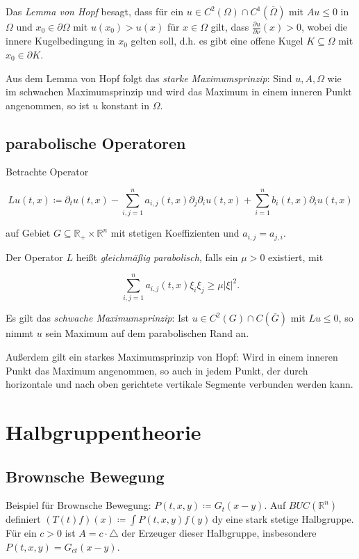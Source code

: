 \documentclass[11pt,a4paper]{scrartcl}
\newcommand{\R}{\mathbb{R}} %
\theoremstyle{plain}
\theoremstyle{definition}
\theoremstyle{remark}
\begin{document}
Das \emph{Lemma von Hopf} besagt, dass für ein $u\in C^2(\Omega) \cap C^1(\overline{\Omega})$ mit $Au\leq 0$ in $\Omega$ und $x_0\in \partial\Omega$ mit $u(x_0) > u(x)$ für $x\in \Omega$ gilt, dass $\frac{\partial u}{\partial \nu}(x) > 0$, wobei die innere Kugelbedingung in $x_0$ gelten soll, d.h. es gibt eine offene Kugel $K\subseteq \Omega$ mit $x_0 \in \partial K$.

Aus dem Lemma von Hopf folgt das \emph{starke Maximumsprinzip}: Sind $u,A,\Omega$ wie im schwachen Maximumsprinzip und wird das Maximum in einem inneren Punkt angenommen, so ist $u$ konstant in $\Omega$.

\subsection{parabolische Operatoren}

Betrachte Operator

$$Lu(t,x)\coloneqq \partial_t u(t,x) -\sum_{i,j=1}^n a_{i,j}(t,x)\partial_j \partial_i u(t,x) + \sum_{i=1}^n b_i(t,x) \partial_i u(t,x)$$

auf Gebiet $G\subseteq \R_+ \times \R^n$ mit stetigen Koeffizienten und $a_{i,j}=a_{j,i}$.

Der Operator $L$ heißt \emph{gleichmäßig parabolisch}, falls ein $\mu > 0$ existiert, mit

$$\sum_{i,j=1}^n a_{i,j}(t,x)\xi_i\xi_j \geq \mu |\xi|^2.$$

Es gilt das \emph{schwache Maximumsprinzip}: Ist $u\in C^2(G) \cap C(\overline{G})$ mit $Lu \leq 0$, so nimmt $u$ sein Maximum auf dem parabolischen Rand an.

Außerdem gilt ein starkes Maximumsprinzip von Hopf: Wird in einem inneren Punkt das Maximum angenommen, so auch in jedem Punkt, der durch horizontale und nach oben gerichtete vertikale Segmente verbunden werden kann.

\section{Halbgruppentheorie}

\subsection{Brownsche Bewegung}

Beispiel für Brownsche Bewegung: $P(t,x,y)\coloneqq G_t(x-y)$. Auf $BUC(\R^n)$ definiert $(T(t)f)(x)\coloneqq \int P(t,x,y)f(y) \, \mathrm{dy}$ eine stark stetige Halbgruppe. Für ein $c > 0$ ist $A=c\cdot\triangle$ der Erzeuger dieser Halbgruppe, insbesondere $P(t,x,y) = G_{ct}(x-y)$.
\end{document}
